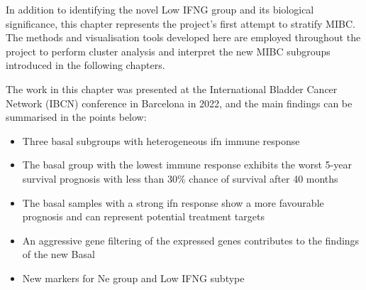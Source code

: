In addition to identifying the novel Low IFNG group and its biological significance, this chapter represents the project's first attempt to stratify MIBC. The methods and visualisation tools developed here are employed throughout the project to perform cluster analysis and interpret the new MIBC subgroups introduced in the following chapters.

The work in this chapter was presented at the International Bladder Cancer Network (IBCN) conference in Barcelona in 2022, and the main findings can be summarised in the points below:

\begin{itemize}
    \item Three basal subgroups with heterogeneous \acrlong{ifn} immune response
    \item The basal group with the lowest immune response exhibits the worst 5-year survival prognosis with less than 30\% chance of survival after 40 months
    \item The basal samples with a strong \acrshort{ifn} response show a more favourable prognosis and can represent potential treatment targets
    \item An aggressive gene filtering of the expressed genes contributes to the findings of the new Basal 
    \item New markers for Ne group and Low IFNG subtype
\end{itemize}